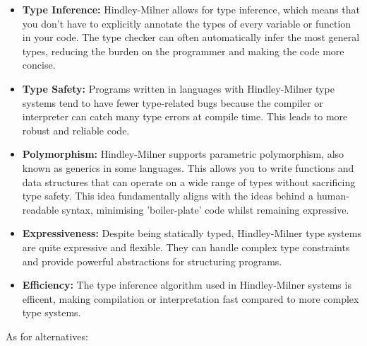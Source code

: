 \documentclass{l4proj}
\begin{document}
\begin{itemize}
    \item \textbf{Type Inference:} Hindley-Milner allows for type inference, which means that you don't have to explicitly annotate the types of every variable or function in your code.
    The type checker can often automatically infer the most general types, reducing the burden on the programmer and making the code more concise.
    \item \textbf{Type Safety:} Programs written in languages with Hindley-Milner type systems tend to have fewer type-related bugs because the compiler or interpreter can catch many type errors at compile time.
    This leads to more robust and reliable code.
    \item \textbf{Polymorphism:} Hindley-Milner supports parametric polymorphism, also known as generics in some languages.
    This allows you to write functions and data structures that can operate on a wide range of types without sacrificing type safety.
    This idea fundamentally aligns with the ideas behind a human-readable syntax, minimising 'boiler-plate' code whilst remaining expressive.
    \item \textbf{Expressiveness:} Despite being statically typed, Hindley-Milner type systems are quite expressive and flexible.
    They can handle complex type constraints and provide powerful abstractions for structuring programs.
    \item \textbf{Efficiency:} The type inference algorithm used in Hindley-Milner systems is efficent, making compilation or interpretation fast compared to more complex type systems.
\end{itemize}

As for alternatives:
\end{document}
